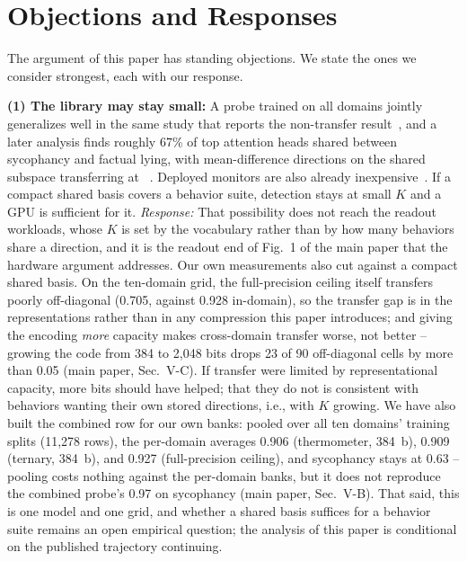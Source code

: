 \section{Objections and Responses}
\label{sec:RedTeam}

The argument of this paper has standing objections. We state the ones
we consider strongest, each with our response.

\textbf{(1) The library may stay small:} A probe trained on all
domains jointly generalizes well in the same study that reports the
non-transfer result~\cite{ying2026spectrum}, and a later analysis
finds roughly 67\% of top attention heads shared between sycophancy
and factual lying, with mean-difference directions on the shared
subspace transferring at ~\cite{pandey2026shared}. Deployed
monitors are also already
inexpensive~\cite{anthropic2025cheapmonitors}. If a compact shared
basis covers a behavior suite, detection stays at small $K$ and a GPU
is sufficient for it. \emph{Response:} That possibility does not reach
the readout workloads, whose $K$ is set by the vocabulary rather than
by how many behaviors share a direction, and it is the readout end of
Fig.~1 of the main paper that the hardware argument addresses. Our own
measurements also cut against a compact shared basis. On the
ten-domain grid, the full-precision ceiling itself transfers poorly
off-diagonal (0.705, against 0.928 in-domain), so the transfer gap is
in the representations rather than in any compression this paper
introduces; and giving the encoding \emph{more} capacity makes
cross-domain transfer worse, not better -- growing the code from 384
to 2{,}048 bits drops 23 of 90 off-diagonal cells by more than 0.05
\auroc (main paper, Sec.~V-C). If transfer were limited by
representational capacity, more bits should have helped; that they do
not is consistent with behaviors wanting their own stored directions,
i.e., with $K$ growing. We have also built the combined row for our
own banks: pooled over all ten domains' training splits (11{,}278
rows), the per-domain \auroc averages 0.906 (thermometer, 384~b),
0.909 (ternary, 384~b), and 0.927 (full-precision ceiling), and
sycophancy stays at 0.63 -- pooling costs nothing against the
per-domain banks, but it does not reproduce the combined probe's 0.97
on sycophancy (main paper, Sec.~V-B). That said, this is one model and one grid,
and whether a shared basis suffices for a behavior suite remains an
open empirical question; the analysis of this paper is conditional on
the published trajectory continuing.

